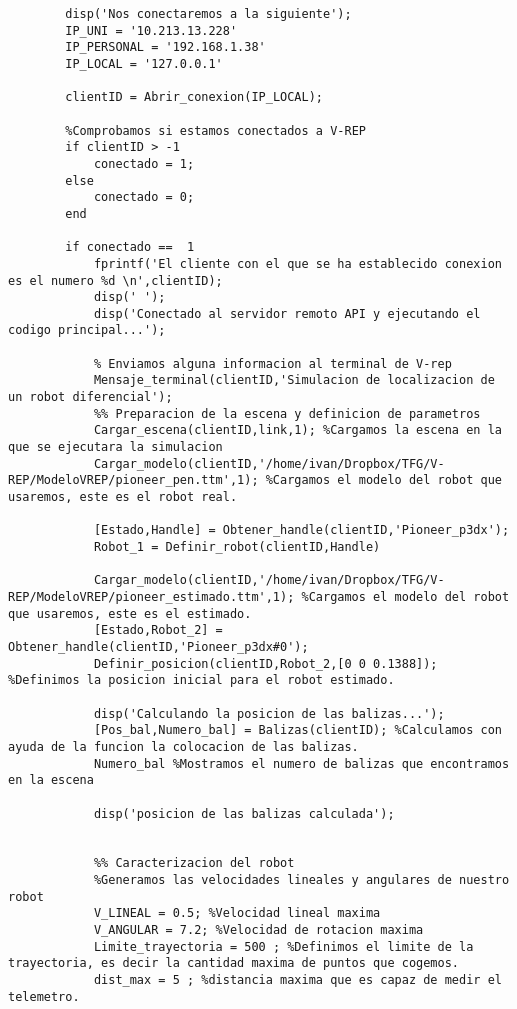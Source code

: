 \begin{lstlisting}[frame=single]
        %Aqui es donde empieza el codigo principal
        disp('Nos conectaremos a la siguiente');
        IP_UNI = '10.213.13.228'
        IP_PERSONAL = '192.168.1.38'
        IP_LOCAL = '127.0.0.1'

        clientID = Abrir_conexion(IP_LOCAL);

        %Comprobamos si estamos conectados a V-REP
        if clientID > -1 
            conectado = 1;
        else 
            conectado = 0;
        end

        if conectado ==  1
            fprintf('El cliente con el que se ha establecido conexion es el numero %d \n',clientID);
            disp(' ');
            disp('Conectado al servidor remoto API y ejecutando el codigo principal...');
            	
            % Enviamos alguna informacion al terminal de V-rep
            Mensaje_terminal(clientID,'Simulacion de localizacion de un robot diferencial');
            %% Preparacion de la escena y definicion de parametros
            Cargar_escena(clientID,link,1); %Cargamos la escena en la que se ejecutara la simulacion
            Cargar_modelo(clientID,'/home/ivan/Dropbox/TFG/V-REP/ModeloVREP/pioneer_pen.ttm',1); %Cargamos el modelo del robot que usaremos, este es el robot real.
            
            [Estado,Handle] = Obtener_handle(clientID,'Pioneer_p3dx');
            Robot_1 = Definir_robot(clientID,Handle)
            
            Cargar_modelo(clientID,'/home/ivan/Dropbox/TFG/V-REP/ModeloVREP/pioneer_estimado.ttm',1); %Cargamos el modelo del robot que usaremos, este es el estimado.
            [Estado,Robot_2] = Obtener_handle(clientID,'Pioneer_p3dx#0');
            Definir_posicion(clientID,Robot_2,[0 0 0.1388]); %Definimos la posicion inicial para el robot estimado.
            
            disp('Calculando la posicion de las balizas...');
            [Pos_bal,Numero_bal] = Balizas(clientID); %Calculamos con ayuda de la funcion la colocacion de las balizas.
            Numero_bal %Mostramos el numero de balizas que encontramos en la escena 
            
            disp('posicion de las balizas calculada');
            

            %% Caracterizacion del robot
            %Generamos las velocidades lineales y angulares de nuestro robot
            V_LINEAL = 0.5; %Velocidad lineal maxima
            V_ANGULAR = 7.2; %Velocidad de rotacion maxima
            Limite_trayectoria = 500 ; %Definimos el limite de la trayectoria, es decir la cantidad maxima de puntos que cogemos.
            dist_max = 5 ; %distancia maxima que es capaz de medir el telemetro.


\end{lstlisting}
